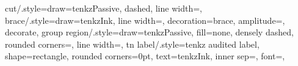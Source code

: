 {  cut/.style={draw=tenkzPassive, dashed, line width=\tenkz@annwidth},
  brace/.style={draw=tenkzInk, line width=\tenkz@annwidth,
      decoration={brace, amplitude=\tenkz@braceamp}, decorate},
  group region/.style={draw=tenkzPassive, fill=none, densely dashed,
      rounded corners=\tenkz@groupcorner, line width=\tenkz@annwidth},
  tn label/.style={tenkz audited label, shape=rectangle, rounded corners=0pt,
      text=tenkzInk, inner sep=\tenkz@labelinset, font=\scriptsize},
}

\newwrite\tenkz@log
\newif\iftenkz@logopen
\newcount\tenkz@pictureid
\newif\iftenkz@auditpicture
\tenkz@auditpicturefalse
\def\tenkz@auditpictureid{\the\tenkz@pictureid}
\AtBeginDocument{\immediate\openout\tenkz@log=\jobname.tnlog\tenkz@logopentrue}
\AtEndDocument{\iftenkz@logopen\immediate\closeout\tenkz@log\fi}
\def\tenkz@event#1{\iftenkz@logopen
  \immediate\write\tenkz@log{#1}\fi}

